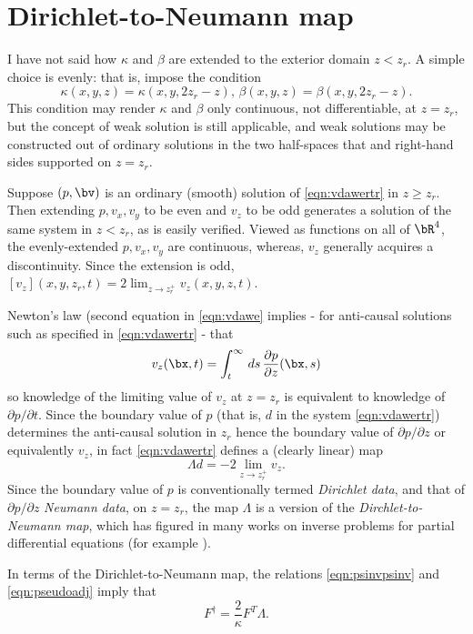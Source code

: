 \section{Dirichlet-to-Neumann map}


I have not said how $\kappa$ and $\beta$ are extended to the exterior domain $z<z_r$. A simple choice is evenly: that is, impose the condition
\[
\kappa(x,y,z)=\kappa(x,y,2z_r-z), \,\beta(x,y,z)=\beta(x,y,2z_r-z).
\]
This condition may render $\kappa$ and $\beta$ only continuous, not differentiable, at $z=z_r$, but the concept of weak solution is still applicable, and weak solutions may be constructed out of ordinary solutions in the two half-spaces that and right-hand sides supported on $z=z_r$.

Suppose $(p,\bv)$ is an ordinary (smooth) solution of \ref{eqn:vdawertr} in $z\ge z_r$. Then extending $p, v_x, v_y$ to be even and $v_z$ to be odd generates a solution of the same system in $z<z_r$, as is easily verified. Viewed as functions on all of $\bR^4$, the evenly-extended $p,v_x,v_y$ are continuous, whereas, $v_z$ generally acquires a discontinuity. Since the extension is odd, $[v_z](x,y,z_r,t) =2 \lim_{z \rightarrow z_r^+}v_z(x,y,z,t)$. 

Newton's law (second equation in \ref{eqn:vdawe} implies - for anti-causal solutions such as specified in \ref{eqn:vdawertr} - that
\[
v_z(\bx,t) = \int^{\infty}_t \,ds\,\frac{\partial p}{\partial z}(\bx,s)
\]
so knowledge of the limiting value of $v_z$ at $z=z_r$ is equivalent to knowledge of $\partial p/\partial t$. Since the boundary value of $p$ (that is, $d$ in the system \ref{eqn:vdawertr}) determines the anti-causal solution in $z_r$ hence the boundary value of $\partial p/\partial z$ or equivalently $v_z$, in fact \ref{eqn:vdawertr} defines a (clearly linear) map 
\begin{equation}
\label{eqn:dtondef}
\Lambda d =-2 \lim_{z \rightarrow z_r^+}v_z.
\end{equation} 
Since the boundary value of $p$ is conventionally termed {\em Dirichlet data}, and that of $\partial p/\partial z$ {\em Neumann data}, on $z=z_r$, the map $\Lambda$ is a version of the {\em Dirchlet-to-Neumann map}, which has figured in many works on inverse problems for partial differential equations (for example \cite{Uhl18}). 

In terms of the Dirichlet-to-Neumann map, the relations \ref{eqn:psinvpsinv} and \ref{eqn:pseudoadj} imply that
\begin{equation}
\label{eqn:pseudodton}
F^{\dagger} = \frac{2}{\kappa} F^T \Lambda .
\end{equation}

